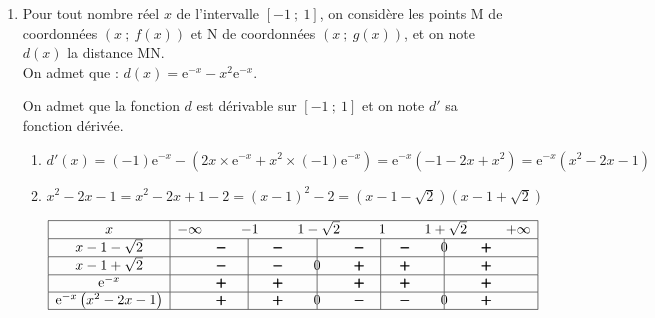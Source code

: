 \documentclass[10pt]{article}
\providecommand{\e}{{\mathrm{e}}}
\begin{document}
\begin{enumerate}
\begin{enumerate}
	\end{enumerate}
\item  Pour tout nombre réel $x$ de l'intervalle $[-1~;~1]$, on considère les points M de coordonnées $(x~;~f(x))$ et N de coordonnées $(x~;~g(x))$, et on note $d(x)$ la distance MN. \\
On admet que : $d(x)= \e^{-x} - x^2\e^{-x}$.

On admet que la fonction $d$ est dérivable sur  $[-1~;~1]$ et on note $d'$ sa fonction dérivée.
	\begin{enumerate}
		\item 
$d'(x) = (-1) \e^{-x} - \left ( 2x \times \e^{-x} + x^2 \times (-1)\e^{-x}\right )
= \e^{-x} \left ( -1 -2x +x^2\right ) = \e^{-x} \left (x^2-2x-1\right )$
				
		\item
$x^2-2x-1 = x^2-2x+1-2 = (x-1)^2-2 = \left ( x-1-\sqrt{2}\right )\left (x-1+\sqrt{2}\right )$

\begin{center}
{
\renewcommand{\arraystretch}{1.5}
\def\esp{\hspace*{0cm}}
$\begin{array}{|c | *{11}{c} |} 
\hline
x  & -\infty & \esp & -1 & \esp & 1-\sqrt{2} & \esp & 1 & \esp & 1+\sqrt{2} & \esp & +\infty \\
\hline
x-1-\sqrt{2} &  & \pmb{-} & \vline\hspace{-2.7pt}{\phantom 0} & \pmb{-} &  \vline\hspace{-2.7pt}{\phantom 0} & \pmb{-} & \vline\hspace{-2.7pt}{\phantom 0} & \pmb{-} &  \vline\hspace{-2.7pt}{0} & \pmb{+} &\\
\hline
x-1+\sqrt{2} &  & \pmb{-} & \vline\hspace{-2.7pt}{\phantom 0} & \pmb{-} &  \vline\hspace{-2.7pt}{0} & \pmb{+} & \vline\hspace{-2.7pt}{\phantom 0} & \pmb{+} &  \vline\hspace{-2.7pt}{\phantom 0} & \pmb{+} &\\
\hline
\e^{-x} &  & \pmb{+} & \vline\hspace{-2.7pt}{\phantom 0} & \pmb{+} &  \vline\hspace{-2.7pt}{\phantom 0} & \pmb{+} & \vline\hspace{-2.7pt}{\phantom 0} & \pmb{+} &  \vline\hspace{-2.7pt}{\phantom 0} & \pmb{+} &\\
\hline
\e^{-x} \left (x^2-2x-1\right )&  & \pmb{+} & \vline\hspace{-2.7pt}{\phantom 0} & \pmb{+} &  \vline\hspace{-2.7pt}{0} & \pmb{-} & \vline\hspace{-2.7pt}{\phantom 0} & \pmb{-} &  \vline\hspace{-2.7pt}{0} & \pmb{+} &\\
\hline
\end{array}$
}
\end{center}


\end{enumerate}
\end{enumerate}
\end{document}
